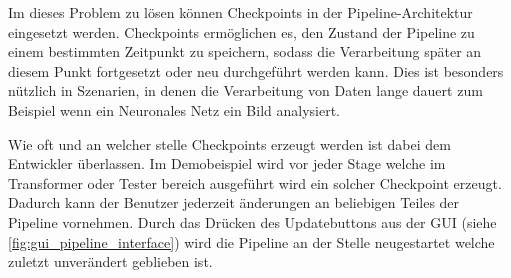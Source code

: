 \documentclass[a4paper]{article} %
\begin{document}
Im dieses Problem zu lösen können Checkpoints in der Pipeline-Architektur eingesetzt werden. Checkpoints ermöglichen es, den Zustand der Pipeline zu einem bestimmten Zeitpunkt zu speichern, sodass die Verarbeitung später an diesem Punkt fortgesetzt oder neu durchgeführt werden kann. Dies ist besonders nützlich in Szenarien, in denen die Verarbeitung von Daten lange dauert zum Beispiel wenn ein Neuronales Netz ein Bild analysiert.

Wie oft und an welcher stelle Checkpoints erzeugt werden ist dabei dem Entwickler überlassen. Im Demobeispiel wird vor jeder Stage welche im Transformer oder Tester bereich ausgeführt wird ein solcher Checkpoint erzeugt. Dadurch kann der Benutzer jederzeit änderungen an beliebigen Teiles der Pipeline vornehmen. Durch das Drücken des Updatebuttons aus der GUI (siehe \ref{fig:gui_pipeline_interface}) wird die Pipeline an der Stelle neugestartet welche zuletzt unverändert geblieben ist.
\end{document}
